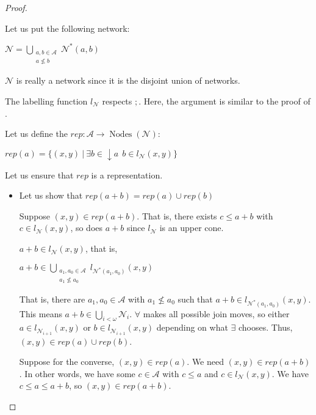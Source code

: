 \documentclass[a4paper]{article}
\theoremstyle{definition}
\theoremstyle{theorem}
\theoremstyle{proposition}
\theoremstyle{lemma}
\theoremstyle{ex}
\theoremstyle{corollary}
\theoremstyle{claim}
\begin{document}
\begin{proof}
\begin{enumerate}
    Let us put the following network:

    \begin{center}
      $\mathcal{N} = \bigcup \limits_{\substack{a, b \in \mathcal{A} \\ a \not\leq b}} \mathcal{N}^{*}(a,b)$
    \end{center}

    $\mathcal{N}$ is really a network since it is the disjoint union of networks.

    The labelling function $l_{\mathcal{N}}$ respects $;$. Here, the argument is similar to the proof of \cite[Proposition 5]{hirsch2005class}.

    Let us define the $rep : \mathcal{A} \to \operatorname{Nodes}(\mathcal{N})$:
    \begin{center}
      $rep(a) = \{ (x, y) \: | \: \exists b \in \downarrow a \:\: b \in l_{\mathcal{N}}(x, y)\}$
    \end{center}

    Let us ensure that $rep$ is a representation.

    \begin{itemize}
  \item Let us show that $rep(a + b) = rep(a) \cup rep(b)$

  Suppose $(x, y) \in rep(a + b)$. That is, there exists $c \leq a + b$ with $c \in l_{\mathcal{N}}(x, y)$, so does $a + b$ since $l_{\mathcal{N}}$ is an upper cone.

  $a + b \in l_{\mathcal{N}}(x, y)$, that is,

\begin{center}
$a + b \in \bigcup \limits_{ \substack{a_1, a_0 \in \mathcal{A} \\ a_1 \not\leq a_0}} l_{\mathcal{N}^{*}(a_1, a_0)}(x,y)$
\end{center}

That is, there are $a_1, a_0 \in \mathcal{A}$ with $a_1 \not\leq a_0$ such that $a + b \in l_{\mathcal{N}^{*}(a_1, a_0)}(x,y)$.
This means $a + b \in \bigcup \limits_{i < \omega} \mathcal{N}_i$.
$\forall$ makes all possible join moves, so either $a \in l_{\mathcal{N}_{i + 1}}(x, y)$ or $b \in l_{\mathcal{N}_{i + 1}}(x, y)$ depending on what $\exists$ chooses.
Thus, $(x, y) \in rep(a) \cup rep(b)$.

Suppose for the converse, $(x, y) \in rep(a)$. We need $(x, y) \in rep(a + b)$.
In other words, we have some $c \in \mathcal{A}$ with $c \leq a$ and $c \in l_{\mathcal{N}}(x, y)$.
We have $c \leq a \leq a + b$, so $(x, y) \in rep(a + b)$.


\end{itemize}
\end{enumerate}
\end{proof}
\end{document}
